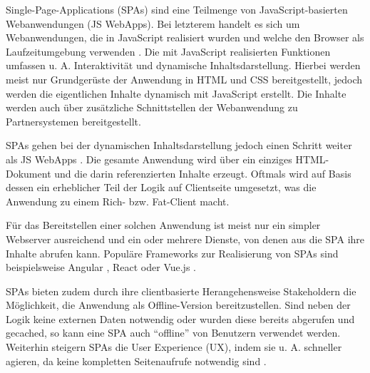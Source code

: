 



Single-Page-Applications (SPAs) sind eine Teilmenge von JavaScript-basierten Webanwendungen (JS WebApps). Bei letzterem handelt es sich um Webanwendungen, die in JavaScript realisiert wurden und welche den Browser als Laufzeitumgebung verwenden \cite{TimeToTakeJavaScriptSeriously}. Die mit JavaScript realisierten Funktionen umfassen u. A. Interaktivität und dynamische Inhaltsdarstellung. Hierbei werden meist nur Grundgerüste der Anwendung in HTML und CSS bereitgestellt, jedoch werden die eigentlichen Inhalte dynamisch mit JavaScript erstellt. Die Inhalte werden auch über zusätzliche Schnittstellen der Webanwendung zu Partnersystemen bereitgestellt.

SPAs gehen bei der dynamischen Inhaltsdarstellung jedoch einen Schritt weiter als JS WebApps \cite{SinglePageApplication}. Die gesamte Anwendung wird über ein einziges HTML-Dokument und die darin referenzierten Inhalte erzeugt. Oftmals wird auf Basis dessen ein erheblicher Teil der Logik auf Clientseite umgesetzt, was die Anwendung zu einem Rich- bzw. Fat-Client macht.

Für das Bereitstellen einer solchen Anwendung ist meist nur ein simpler Webserver ausreichend und ein oder mehrere Dienste, von denen aus die SPA ihre Inhalte abrufen kann. Populäre Frameworks zur Realisierung von SPAs sind beispielsweise Angular \cite{AngularHomepage}, React \cite{ReactHomepage} oder Vue.js \cite{VueJSHomepage}.

SPAs bieten zudem durch ihre clientbasierte Herangehensweise Stakeholdern die Möglichkeit, die Anwendung als Offline-Version bereitzustellen. Sind neben der Logik keine externen Daten notwendig oder wurden diese bereits abgerufen und gecached, so kann eine SPA auch \enquote{offline} von Benutzern verwendet werden. Weiterhin steigern SPAs die User Experience (UX), indem sie u. A. schneller agieren, da keine kompletten Seitenaufrufe notwendig sind \cite{ImprovementOfAcedemicServiceBasedOnSPA}.

